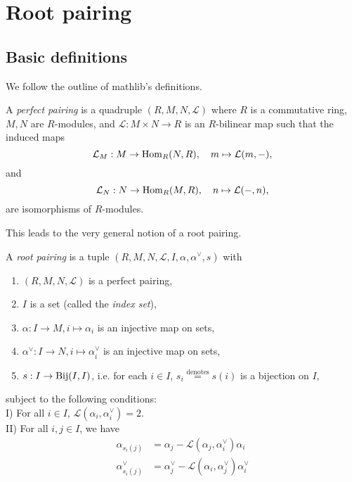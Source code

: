 \chapter{Root pairing}
\label{cha:root-pairing}
\section{Basic definitions}
\label{sec:basic-definitions}

We follow the outline of mathlib's definitions. 

\begin{definition}
    \label{def:perfect-pairing}
    \leanok
    A {\it perfect pairing} is a quadruple $(R,M,N,\mathcal{L})$ where $R$ is a commutative ring, $M,N$ are 
    $R$-modules, and $\mathcal{L} : M \times N \to R$ is an $R$-bilinear map such that the induced maps
    \[
        \mathcal{L}_M : M \to {\rm Hom}_R(N,R), \quad m \mapsto \mathcal{L}(m,-),
    \]
    and 
    \[
        \mathcal{L}_N : N \to {\rm Hom}_R(M,R), \quad n \mapsto \mathcal{L}(-,n),
    \]
    are isomorphisms of $R$-modules.
\end{definition}

This leads to the very general notion of a root pairing.
\begin{definition}
    \label{def:root-pairing}
    \leanok
    A {\it root pairing} is a tuple $(R,M,N,\mathcal{L},I,\alpha, \alpha^\vee,s)$ with
       \begin{enumerate} 
        \item $(R,M,N,\mathcal{L})$ is a perfect pairing,
        \item  $I$ is a set (called the {\it index set}),
        \item $\alpha : I \to M, i \mapsto \alpha_i$ is an injective map on sets,
        \item $\alpha^\vee : I \to N, i \mapsto \alpha_i^\vee$ is an injective map on sets,
        \item $s : I \to {\rm Bij}(I,I)$, i.e. for each $i \in I$, $s_i \stackrel{\text{denotes}}{=}s(i)$ is a bijection on $I$,
       \end{enumerate}
       subject to the following conditions:\\
       I) For all $i \in I$, $\mathcal{L}(\alpha_i,\alpha^\vee_i) = 2$. \\
       II) For all $i,j \in I$, we have
            \begin{align*}
            \alpha_{s_i(j)} &= \alpha_j - \mathcal{L}(\alpha_j,\alpha^\vee_i)\alpha_i \\
            \alpha_{s_i(j)}^\vee &= \alpha_j^\vee - \mathcal{L}(\alpha_i,\alpha^\vee_j)\alpha_i^\vee
            \end{align*}
\end{definition}

